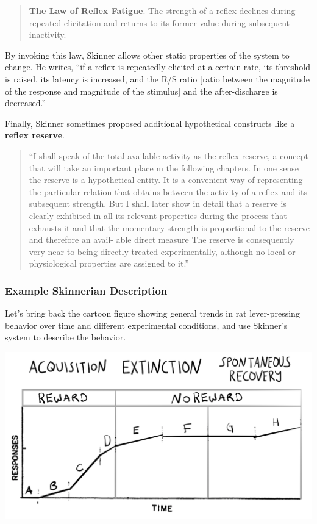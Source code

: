 \documentclass[
  oneside,
  12pt]{crumpbook}
\begin{document}
\begin{quote}
\textbf{The Law of Reflex Fatigue}. The strength of a reflex declines during repeated elicitation and returns to its former value during subsequent inactivity.
\end{quote}

By invoking this law, Skinner allows other static properties of the system to change. He writes, ``if a reflex is repeatedly elicited at a certain rate, its threshold is raised, its latency is increased, and the R/S ratio {[}ratio between the magnitude of the response and magnitude of the stimulus{]} and the after-discharge is decreased.''

Finally, Skinner sometimes proposed additional hypothetical constructs like a \textbf{reflex reserve}.

\begin{quote}
``I shall speak of the total available activity as the reflex reserve, a concept that will take an important place m the following chapters. In one sense the reserve is a hypothetical entity. It is a convenient way of representing the particular relation that obtains between the activity of a reflex and its subsequent strength. But I shall later show in detail that a reserve is clearly exhibited in all its relevant properties during the process that exhausts it and that the momentary strength is proportional to the reserve and therefore an avail- able direct measure The reserve is consequently very near to being directly treated experimentally, although no local or physiological properties are assigned to it.''
\end{quote}

\hypertarget{example-skinnerian-description}{%
\subsubsection{Example Skinnerian Description}\label{example-skinnerian-description}}

Let's bring back the cartoon figure showing general trends in rat lever-pressing behavior over time and different experimental conditions, and use Skinner's system to describe the behavior.

\begin{center}\includegraphics[width=1\linewidth]{imgs/Skinner_description} \end{center}
\end{document}
